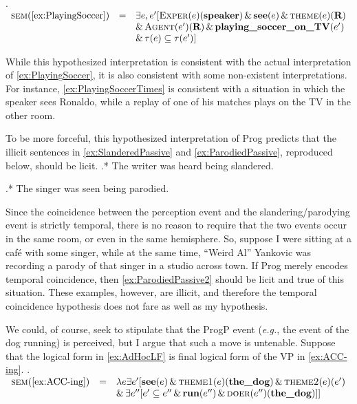 \documentclass[MilwayThesis]{subfiles}
\begin{document}
\ex.\label{ex:PlayingSoccerTimes} 
$\begin{array}{rcl}
	\textsc{sem}(\cref{ex:PlayingSoccer}) & =  & \exists e, e^{\prime} [\textsc{Exper}(e)(\textbf{speaker}) \,\&\, \textbf{see}(e) \,\&\, \textsc{theme}(e)(\textbf{R})\\
	& & \&\, \textsc{Agent}(e^{\prime})(\textbf{R}) \,\&\, \textbf{playing\_soccer\_on\_TV}(e^{\prime})\\
	& & \&\, \tau(e) \subseteq \tau(e^{\prime})] 
\end{array}$

While this hypothesized interpretation is consistent with the actual interpretation of \cref{ex:PlayingSoccer}, it is also consistent with some non-existent interpretations.
For instance, \cref{ex:PlayingSoccerTimes} is consistent with a situation in which the speaker sees Ronaldo, while a replay of one of his matches plays on the TV in the other room.

To be more forceful, this hypothesized interpretation of Prog predicts that the illicit sentences in \cref{ex:SlanderedPassive} and \cref{ex:ParodiedPassive}, reproduced below, should be licit.
\ex.* The writer was heard being slandered.\label{ex:SlanderedPassive22}

\ex.* The singer was seen being parodied.\label{ex:ParodiedPassive2}

Since the coincidence between the perception event and the slandering/parodying event is strictly temporal, there is no reason to require that the two events occur in the same room, or even in the same hemisphere.
So, suppose I were sitting at a caf\'e with some singer, while at the same time, ``Weird Al'' Yankovic was recording a parody of that singer in a studio across town.
If Prog merely encodes temporal coincidence, then \cref{ex:ParodiedPassive2} should be licit and true of this situation.
These examples, however, are illicit, and therefore the temporal coincidence hypothesis does not fare as well as my hypothesis.

We could, of course, seek to stipulate that the ProgP event (\textit{e.g.}, the event of the dog running) is perceived, but I argue that such a move is untenable.
Suppose that the logical form in \cref{ex:AdHocLF} is final logical form of the VP in \cref{ex:ACC-ing}.
\ex.\label{ex:AdHocLF}
$
\begin{array}[t]{rcl}
	\textsc{sem}(\text{\cref{ex:ACC-ing}}) & = & \lambda e \exists e^{\prime} [ \textbf{see}(e) \,\&\, \textsc{theme1}(e)(\textbf{the\_dog}) \,\&\, \textsc{theme2}(e)(e^{\prime})\\
	& & \&\, \exists e^{\prime\prime}[ e^{\prime} \subseteq e^{\prime\prime} \,\&\, \textbf{run}(e^{\prime\prime}) \,\&\, \textsc{doer}(e^{\prime\prime})(\textbf{the\_dog})]]
\end{array}
$
\end{document}
